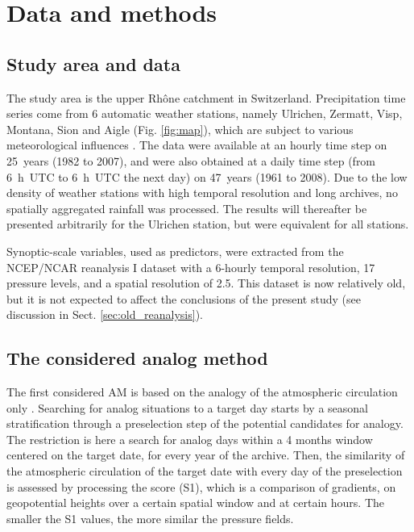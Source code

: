 \documentclass[hess, manuscript]{copernicus}
\begin{document}
\section{Data and methods}
\label{sec:data_methods}

\subsection{Study area and data}
\label{sec:data}

The study area is the upper Rh\^{o}ne catchment in Switzerland. Precipitation time series come from 6 automatic weather stations, namely Ulrichen, Zermatt, Visp, Montana, Sion and Aigle (Fig. \ref{fig:map}), which are subject to various meteorological influences \citep{Horton2012}. The data were available at an hourly time step on 25~years (1982 to 2007), and were also obtained at a daily time step (from 6~h~UTC to 6~h~UTC the next day) on 47~years (1961 to 2008). Due to the low density of weather stations with high temporal resolution and long archives, no spatially aggregated rainfall was processed. The results will thereafter be presented arbitrarily for the Ulrichen station, but were equivalent for all stations.

Synoptic-scale variables, used as predictors, were extracted from the NCEP/NCAR reanalysis I dataset \citep{Kalnay1996} with a 6-hourly temporal resolution, 17 pressure levels, and a spatial resolution of 2.5\degree. This dataset is now relatively old, but it is not expected to affect the conclusions of the present study (see discussion in Sect. \ref{sec:old_reanalysis}).


\subsection{The considered analog method}
\label{sec:analog_method}

The first considered AM is based on the analogy of the atmospheric circulation only \citep[Table \ref{table:method_2Z},][]{Obled2002, Bontron2005, Marty2012}. Searching for analog situations to a target day starts by a seasonal stratification through a preselection step of the potential candidates for analogy. The restriction is here a search for analog days within a 4 months window centered on the target date, for every year of the archive. Then, the similarity of the atmospheric circulation of the target date with every day of the preselection is assessed by processing the \citet{Teweles1954} score (S1), which is a comparison of gradients, on geopotential heights over a certain spatial window and at certain hours. The smaller the S1 values, the more similar the pressure fields.
\end{document}
